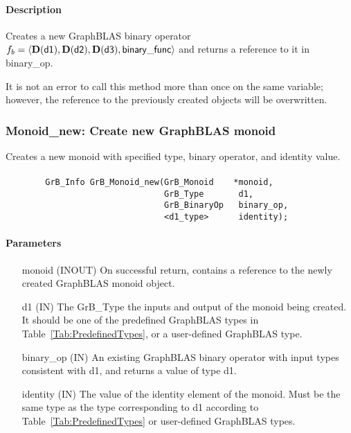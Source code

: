 \paragraph{Description}

Creates a new GraphBLAS binary operator $f_b = \langle \bold{D}({\sf d1}), 
\bold{D}({\sf d2}), \bold{D}({\sf d3}), {\sf binary\_func} \rangle$ and returns
a reference to it in {\sf binary\_op}.

It is not an error to call this method more than once on the same variable;  
however, the reference to the previously created objects will be overwritten. 


\subsubsection{{\sf Monoid\_new}: Create new GraphBLAS monoid}

Creates a new monoid with specified type, binary operator, and identity value.

\paragraph{\syntax}

\begin{verbatim}
        GrB_Info GrB_Monoid_new(GrB_Monoid    *monoid,
                                GrB_Type       d1,
                                GrB_BinaryOp   binary_op,
                                <d1_type>      identity);
\end{verbatim}

\paragraph{Parameters}

\begin{itemize}[leftmargin=1.1in]
    \item[{\sf monoid}] ({\sf INOUT}) On successful return, contains a
    reference to the newly created GraphBLAS monoid object.
    \item[{\sf d1}] ({\sf IN}) The {\sf GrB\_Type} the inputs and output of the 
    monoid being created. It should be one of the predefined GraphBLAS types in
    Table~\ref{Tab:PredefinedTypes}, or a user-defined GraphBLAS type.
    \item[{\sf binary\_op}] ({\sf IN}) An existing GraphBLAS binary operator with input types 
    consistent with {\sf d1}, and returns a value of type {\sf d1}. 
    \item[{\sf identity}]  ({\sf IN}) The value of the identity element of the 
    monoid. Must be the same type as the type corresponding to {\sf d1} according to
    Table~\ref{Tab:PredefinedTypes} or user-defined GraphBLAS types.
\end{itemize}

